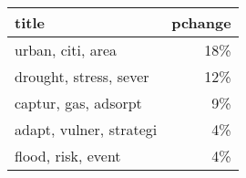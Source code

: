 \begin{tabular}{p{1.2cm}r}
\toprule
                   title &  pchange \\
\midrule
       urban, citi, area &      18\% \\
  drought, stress, sever &      12\% \\
    captur, gas, adsorpt &       9\% \\
 adapt, vulner, strategi &       4\% \\
      flood, risk, event &       4\% \\
\bottomrule
\end{tabular}
